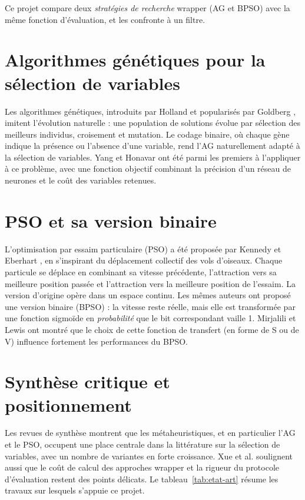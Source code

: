 \documentclass[11pt,a4paper]{report}
\begin{document}
\noindent Ce projet compare deux \emph{stratégies de recherche} wrapper (AG et BPSO) avec la même
fonction d'évaluation, et les confronte à un filtre.

\section{Algorithmes génétiques pour la sélection de variables}
Les algorithmes génétiques, introduits par Holland \cite{holland1975} et popularisés par
Goldberg \cite{goldberg1989}, imitent l'évolution naturelle : une population de solutions évolue
par sélection des meilleurs individus, croisement et mutation. Le codage binaire, où chaque gène
indique la présence ou l'absence d'une variable, rend l'AG naturellement adapté à la sélection de
variables. Yang et Honavar \cite{yang1998} ont été parmi les premiers à l'appliquer à ce
problème, avec une fonction objectif combinant la précision d'un réseau de neurones et le coût
des variables retenues.

\section{PSO et sa version binaire}
L'optimisation par essaim particulaire (PSO) a été proposée par Kennedy et Eberhart
\cite{kennedy1995}, en s'inspirant du déplacement collectif des vols d'oiseaux. Chaque particule
se déplace en combinant sa vitesse précédente, l'attraction vers sa meilleure position passée et
l'attraction vers la meilleure position de l'essaim. La version d'origine opère dans un espace
continu. Les mêmes auteurs ont proposé une version binaire (BPSO) \cite{kennedy1997} : la vitesse
reste réelle, mais elle est transformée par une fonction sigmoïde en \emph{probabilité} que le bit
correspondant vaille 1. Mirjalili et Lewis \cite{mirjalili2013} ont montré que le choix de cette
fonction de transfert (en forme de S ou de V) influence fortement les performances du BPSO.

\section{Synthèse critique et positionnement}
Les revues de synthèse \cite{xue2016,agrawal2021,dokeroglu2022} montrent que les
métaheuristiques, et en particulier l'AG et le PSO, occupent une place centrale dans la littérature
sur la sélection de variables, avec un nombre de variantes en forte croissance. Xue et al.
\cite{xue2016} soulignent aussi que le coût de calcul des approches wrapper et la rigueur du
protocole d'évaluation restent des points délicats. Le tableau~\ref{tab:etat-art} résume les
travaux sur lesquels s'appuie ce projet.
\end{document}

